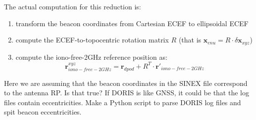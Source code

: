 The actual computation for this reduction is:
\begin{enumerate}
  \item transform the beacon coordinates from Cartesian ECEF to ellipsoidal ECEF
  \item compute the ECEF-to-topocentric rotation matrix $R$ (that is 
    $\bm{x}_{enu} = R \cdot \delta \bm{x}_{xyz}$)
  \item compute the iono-free-2GHz reference position as:
  \begin{equation}
    \bm{r}_{iono-free-2GHz}^{xyz} = \bm{r}_{dpod} + R^T \cdot \bm{r}'_{iono-free-2GHz}
  \end{equation}
\end{enumerate}

{\color{brown}Here we are assuming that the beacon coordinates in the SINEX 
file correspond to the antenna RP. Is that true? If DORIS is like GNSS, it 
could be that the log files contain eccentricities. Make a Python script to 
parse DORIS log files and spit beacon eccentricities.}


